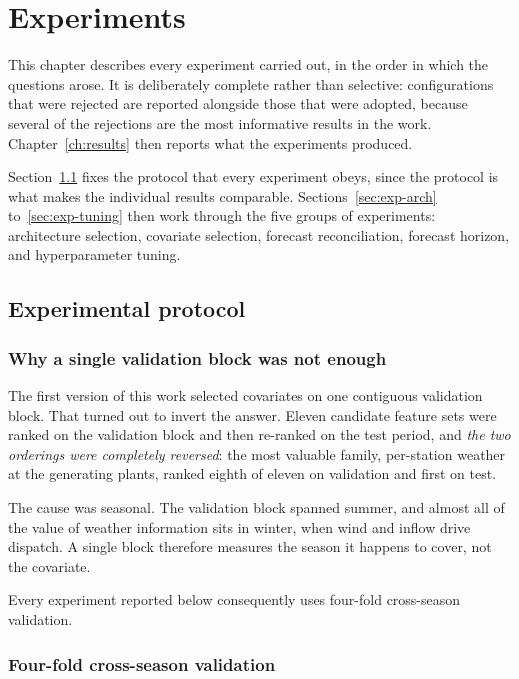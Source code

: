 \chapter{Experiments}
\label{ch:experiments}

This chapter describes every experiment carried out, in the order in which the questions
arose. It is deliberately complete rather than selective: configurations that were
rejected are reported alongside those that were adopted, because several of the rejections
are the most informative results in the work. Chapter~\ref{ch:results} then reports what
the experiments produced.

Section~\ref{sec:protocol} fixes the protocol that every experiment obeys, since the
protocol is what makes the individual results comparable. Sections~\ref{sec:exp-arch}
to~\ref{sec:exp-tuning} then work through the five groups of experiments:
architecture selection, covariate selection, forecast reconciliation, forecast horizon,
and hyperparameter tuning.

\section{Experimental protocol}
\label{sec:protocol}

\subsection{Why a single validation block was not enough}

The first version of this work selected covariates on one contiguous validation block.
That turned out to invert the answer. Eleven candidate feature sets were ranked on the
validation block and then re-ranked on the test period, and \emph{the two orderings were
completely reversed}: the most valuable family, per-station weather at the generating
plants, ranked eighth of eleven on validation and first on test.

The cause was seasonal. The validation block spanned summer, and almost all of the value
of weather information sits in winter, when wind and inflow drive dispatch. A single
block therefore measures the season it happens to cover, not the covariate.

Every experiment reported below consequently uses four-fold cross-season validation.

\subsection{Four-fold cross-season validation}

